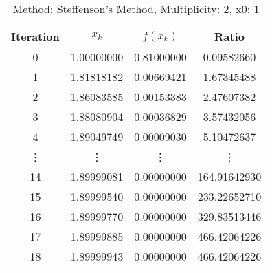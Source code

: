 \begin{table}
\centering
\caption{Method: Steffenson's Method, Multiplicity: 2, x0: 1}
\label{tab:table_Steffenson's_Method_2_1}
\begin{tabular}{c c c c}
\toprule
Iteration &      $x_k$ &   $f(x_k)$ &        Ratio \\
\midrule
        0 & 1.00000000 & 0.81000000 &   0.09582660 \\
        1 & 1.81818182 & 0.00669421 &   1.67345488 \\
        2 & 1.86083585 & 0.00153383 &   2.47607382 \\
        3 & 1.88080904 & 0.00036829 &   3.57432056 \\
        4 & 1.89049749 & 0.00009030 &   5.10472637 \\
   \vdots &     \vdots &     \vdots &       \vdots \\
       14 & 1.89999081 & 0.00000000 & 164.91642930 \\
       15 & 1.89999540 & 0.00000000 & 233.22652710 \\
       16 & 1.89999770 & 0.00000000 & 329.83513446 \\
       17 & 1.89999885 & 0.00000000 & 466.42064226 \\
       18 & 1.89999943 & 0.00000000 & 466.42064226 \\
\bottomrule
\end{tabular}
\end{table}
